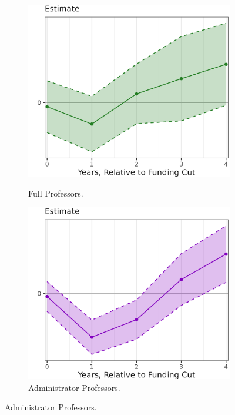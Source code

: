 \begin{figure}[H]
\begin{subfigure}[b]{0.495\textwidth}
        \label{fig:exit-assistant-illinois-lp-rolling}
    \end{subfigure}
    \begin{subfigure}[b]{0.495\textwidth}
        \centering
        \caption{Full Professors.}
        \includegraphics[width=\textwidth]{figures/exit-full-illinois-lp-rolling.png}
        \label{fig:exit-full-illinois-lp-rolling}
    \end{subfigure}
    \begin{subfigure}[b]{0.495\textwidth}
        \centering
        \caption{Administrator Professors.}
        \includegraphics[width=\textwidth]{figures/exit-administrator-illinois-lp-rolling.png}

\end{subfigure}
\end{figure}
